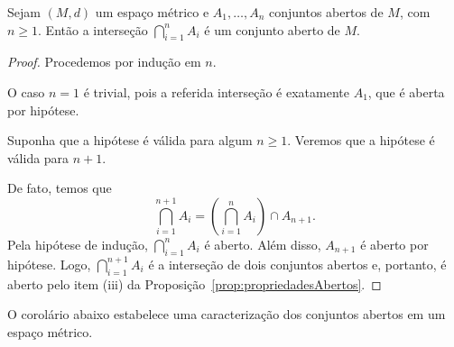 \begin{corollary}
    Sejam $(M,d)$ um espaço métrico e $A_1, \dots, A_n$ conjuntos abertos de $M$, com $n\geq 1$.
    Então a interseção $\bigcap_{i=1}^n A_i$ é um conjunto aberto de $M$.
\end{corollary}
\begin{proof}
    Procedemos por indução em $n$.

    O caso $n=1$ é trivial, pois a referida interseção é exatamente $A_1$, que é aberta por hipótese.

    Suponha que a hipótese é válida para algum $n\geq 1$.
    Veremos que a hipótese é válida para $n+1$.

    De fato, temos que
    \[
        \bigcap_{i=1}^{n+1} A_i = \left(\bigcap_{i=1}^n A_i\right)\cap A_{n+1}.
    \]
    Pela hipótese de indução, $\bigcap_{i=1}^n A_i$ é aberto.
    Além disso, $A_{n+1}$ é aberto por hipótese.
    Logo, $\bigcap_{i=1}^{n+1} A_i$ é a interseção de dois conjuntos abertos e, portanto, é aberto pelo item (iii) da Proposição~\ref{prop:propriedadesAbertos}.
\end{proof}

O corolário abaixo estabelece uma caracterização dos conjuntos abertos em um espaço métrico.

